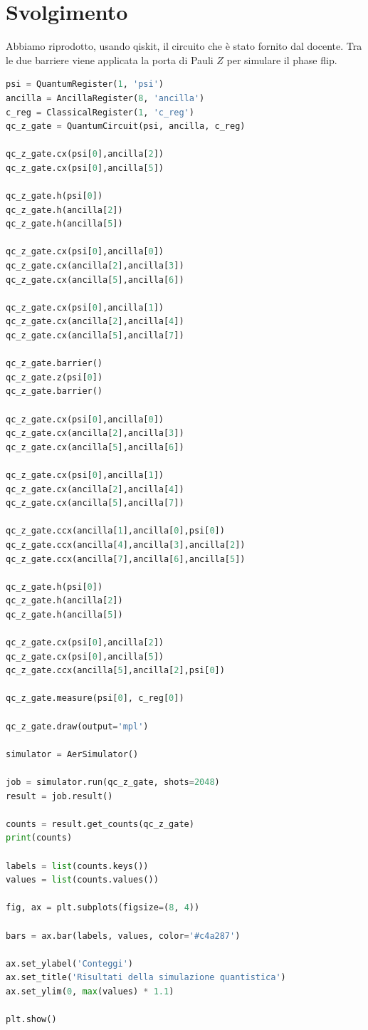 \documentclass[12pt, a4paper]{article}
\begin{document}
\section*{Svolgimento}
Abbiamo riprodotto, usando qiskit, il circuito che è stato fornito dal docente. Tra le due barriere viene applicata la porta di Pauli $Z$ per simulare il phase flip.
\begin{lstlisting}[language={Python}]
psi = QuantumRegister(1, 'psi')
ancilla = AncillaRegister(8, 'ancilla')
c_reg = ClassicalRegister(1, 'c_reg')
qc_z_gate = QuantumCircuit(psi, ancilla, c_reg)

qc_z_gate.cx(psi[0],ancilla[2])
qc_z_gate.cx(psi[0],ancilla[5])

qc_z_gate.h(psi[0])
qc_z_gate.h(ancilla[2])
qc_z_gate.h(ancilla[5])

qc_z_gate.cx(psi[0],ancilla[0])
qc_z_gate.cx(ancilla[2],ancilla[3])
qc_z_gate.cx(ancilla[5],ancilla[6])

qc_z_gate.cx(psi[0],ancilla[1])
qc_z_gate.cx(ancilla[2],ancilla[4])
qc_z_gate.cx(ancilla[5],ancilla[7])

qc_z_gate.barrier()
qc_z_gate.z(psi[0])
qc_z_gate.barrier()

qc_z_gate.cx(psi[0],ancilla[0])
qc_z_gate.cx(ancilla[2],ancilla[3])
qc_z_gate.cx(ancilla[5],ancilla[6])

qc_z_gate.cx(psi[0],ancilla[1])
qc_z_gate.cx(ancilla[2],ancilla[4])
qc_z_gate.cx(ancilla[5],ancilla[7])

qc_z_gate.ccx(ancilla[1],ancilla[0],psi[0])
qc_z_gate.ccx(ancilla[4],ancilla[3],ancilla[2])
qc_z_gate.ccx(ancilla[7],ancilla[6],ancilla[5])

qc_z_gate.h(psi[0])
qc_z_gate.h(ancilla[2])
qc_z_gate.h(ancilla[5])

qc_z_gate.cx(psi[0],ancilla[2])
qc_z_gate.cx(psi[0],ancilla[5])
qc_z_gate.ccx(ancilla[5],ancilla[2],psi[0])

qc_z_gate.measure(psi[0], c_reg[0])

qc_z_gate.draw(output='mpl')

simulator = AerSimulator()

job = simulator.run(qc_z_gate, shots=2048)
result = job.result()

counts = result.get_counts(qc_z_gate)
print(counts)

labels = list(counts.keys())
values = list(counts.values())

fig, ax = plt.subplots(figsize=(8, 4))

bars = ax.bar(labels, values, color='#c4a287')

ax.set_ylabel('Conteggi')
ax.set_title('Risultati della simulazione quantistica')
ax.set_ylim(0, max(values) * 1.1)

plt.show()
\end{lstlisting}
\end{document}
